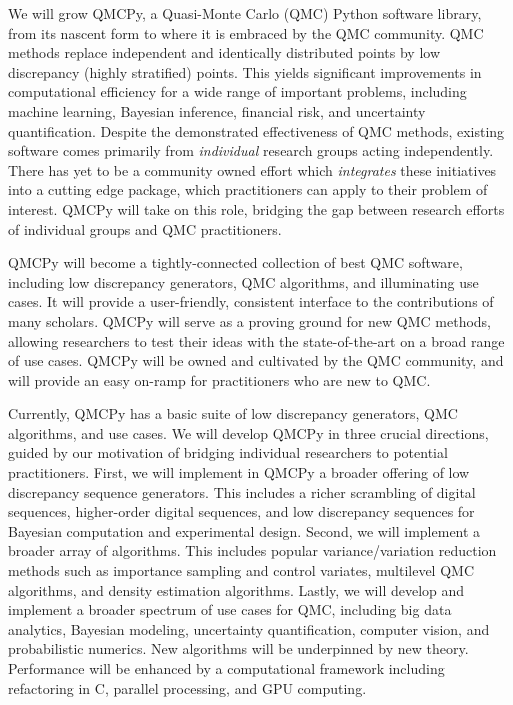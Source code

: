 \documentclass[11pt]{article}%
\begin{document}
 We will grow QMCPy, a Quasi-Monte Carlo (QMC) Python software library, from its nascent form to where it is embraced by the QMC community. QMC methods replace independent and identically distributed points by low discrepancy (highly stratified) points.  This yields significant improvements in computational efficiency for a wide range of important problems, including machine learning, Bayesian inference, financial risk, and uncertainty quantification. Despite the demonstrated effectiveness of QMC methods, existing software comes primarily from \textit{individual} research groups acting independently. There has yet to be a community owned effort which \textit{integrates} these initiatives into a cutting edge package, which practitioners can apply to their problem of interest. QMCPy will take on this role, bridging the gap between research efforts of individual groups and QMC practitioners.

QMCPy will become a tightly-connected collection of best QMC software, including low discrepancy generators, QMC algorithms, and illuminating use cases. It will provide a user-friendly, consistent interface to the contributions of many scholars. QMCPy will serve as a proving ground for new QMC methods, allowing researchers to test their ideas with the state-of-the-art on a broad range of use cases. QMCPy will be owned and cultivated by the QMC community, and will provide an easy on-ramp for practitioners who are new to QMC.

Currently, QMCPy has a basic suite of low discrepancy generators, QMC algorithms,  and use cases. We will develop QMCPy in three crucial directions, guided by our motivation of bridging individual researchers to potential practitioners. First, we will implement in QMCPy a broader offering of low discrepancy sequence generators.  This includes a richer scrambling of digital sequences, higher-order digital sequences, and low discrepancy sequences for Bayesian computation and experimental design. Second, we will implement a broader array of algorithms. This includes popular variance/variation reduction methods such as importance sampling and control variates, multilevel QMC algorithms, and density estimation algorithms. Lastly, we will develop and implement a broader spectrum of use cases for QMC, including big data analytics, Bayesian modeling, uncertainty quantification, computer vision, and probabilistic numerics. New algorithms will be underpinned by new theory.  Performance will be enhanced by a computational framework including refactoring in C, parallel processing, and GPU computing.
\end{document}
